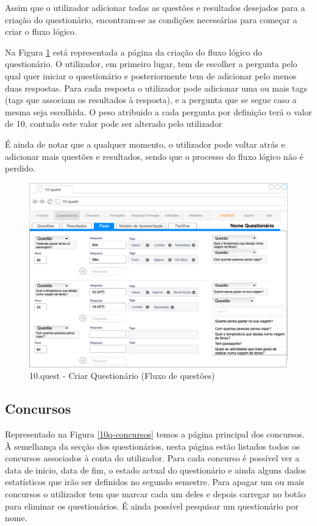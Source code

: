 Assim que o utilizador adicionar todas as questões e resultados desejados para a criação do questionário, encontram-se as condições necessárias para começar a criar o fluxo lógico. 

Na Figura \ref{10q-fluxo} está representada a página da criação do fluxo lógico do questionário. O utilizador, em primeiro lugar, tem de escolher a pergunta pelo qual quer iniciar o questionário e posteriormente tem de adicionar pelo menos duas respostas. Para cada resposta o utilizador pode adicionar uma ou mais tags (tags que associam os resultados à resposta), e a pergunta que se segue caso a mesma seja escolhida. O peso atribuido a cada pergunta por definição terá o valor de 10, contudo este valor pode ser alterado pelo utilizador

É ainda de notar que a qualquer momento, o utilizador pode voltar atrás e adicionar mais questões e resultados, sendo que o processo do fluxo lógico não é perdido.

\begin{figure}[ht!]
	\begin{center}
		\includegraphics[width=1\textwidth]{img/prototipos/17.png}
		\caption{10.quest - Criar Questionário (Fluxo de questões)}
		\label{10q-fluxo}
	\end{center}
\end{figure}

\newpage


\subsection{Concursos}

Representado na Figura \ref{10q-concursos} temos a página principal dos concursos. À semelhança da secção dos questionários, nesta página estão listados todos os concursos associados à conta do utilizador. Para cada concurso é possível ver a data de inicio, data de fim, o estado actual do questionário e ainda alguns dados estatísticos que irão ser definidos no segundo semestre.
Para  apagar um ou mais concursos o utilizador tem que marcar cada um deles e depois carregar no botão para eliminar os questionários. É ainda possível pesquisar um questionário por nome.

